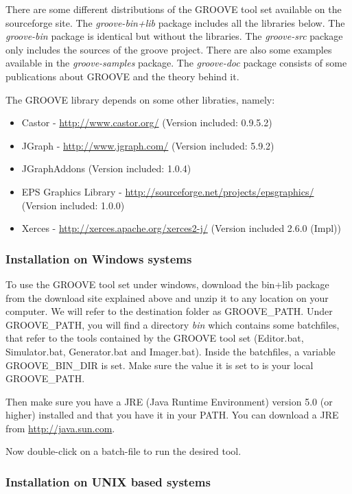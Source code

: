 There are some different distributions of the GROOVE tool set available on the
sourceforge site. The \emph{groove-bin+lib} package includes all the libraries
below. The \emph{groove-bin} package is identical but without the libraries.
The \emph{groove-src} package only includes the sources of the groove project.
There are also some examples available in the \emph{groove-samples} package.
The \emph{groove-doc} package consists of some publications about GROOVE and
the theory behind it.


The GROOVE library depends on some other libraties, namely:

\begin{itemize}\noitemsep
\item Castor - \url{http://www.castor.org/} (Version included: 0.9.5.2)
\item JGraph - \url{http://www.jgraph.com/} (Version included: 5.9.2)
\item JGraphAddons (Version included: 1.0.4)
\item EPS Graphics Library - \url{http://sourceforge.net/projects/epsgraphics/} (Version included: 1.0.0)
\item Xerces - \url{http://xerces.apache.org/xerces2-j/} (Version included 2.6.0 (Impl))
\end{itemize}


\subsubsection{Installation on Windows systems}

To use the GROOVE tool set under windows, download the bin+lib package from the
download site explained above and unzip it to any location on your computer. We
will refer to the destination folder as GROOVE\_PATH. Under GROOVE\_PATH, you
will find a directory \emph{bin} which contains some batchfiles, that refer to
the tools contained by the GROOVE tool set (Editor.bat, Simulator.bat,
Generator.bat and Imager.bat). Inside the batchfiles, a variable
GROOVE\_BIN\_DIR is set. Make sure the value it is set to is your local
GROOVE\_PATH.

Then make sure you have a JRE (Java Runtime Environment) version 5.0 (or
higher) installed and that you have it in your PATH. You can download a JRE
from \url{http://java.sun.com}.

Now double-click on a batch-file to run the desired tool.

\subsubsection{Installation on UNIX based systems}

